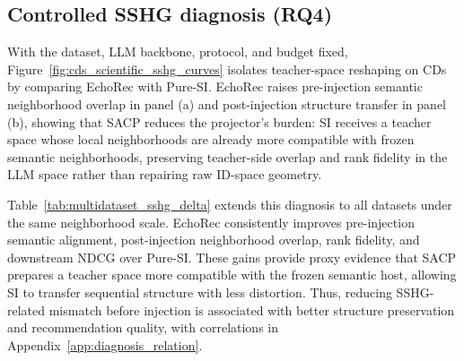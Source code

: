 ﻿\documentclass{article}
\begin{document}
\subsection{Controlled SSHG diagnosis (RQ4)}
\label{subsec:post-sacp}

With the dataset, LLM backbone, protocol, and budget fixed, Figure~\ref{fig:cds_scientific_sshg_curves} isolates teacher-space reshaping on CDs by comparing EchoRec with Pure-SI. EchoRec raises pre-injection semantic neighborhood overlap in panel (a) and post-injection structure transfer in panel (b), showing that SACP reduces the projector's burden: SI receives a teacher space whose local neighborhoods are already more compatible with frozen semantic neighborhoods, preserving teacher-side overlap and rank fidelity in the LLM space rather than repairing raw ID-space geometry.

Table~\ref{tab:multidataset_sshg_delta} extends this diagnosis to all datasets under the same neighborhood scale. EchoRec consistently improves pre-injection semantic alignment, post-injection neighborhood overlap, rank fidelity, and downstream NDCG over Pure-SI. These gains provide proxy evidence that SACP prepares a teacher space more compatible with the frozen semantic host, allowing SI to transfer sequential structure with less distortion. Thus, reducing SSHG-related mismatch before injection is associated with better structure preservation and recommendation quality, with correlations in Appendix~\ref{app:diagnosis_relation}.
\end{document}
